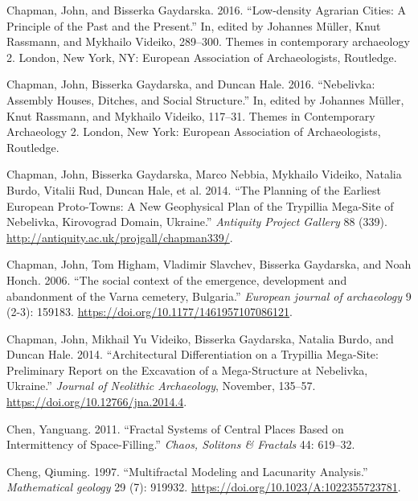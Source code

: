 \documentclass[
  12pt,
  a4paper, twoside]{book}
\newlength{\cslhangindent}
\newlength{\cslentryspacingunit} %
\newenvironment{CSLReferences}[2] %
 {%
  \setlength{\parindent}{0pt}
  \ifodd #1
  \let\oldpar\par
  \def\par{\hangindent=\cslhangindent\oldpar}
  \fi
  \setlength{\parskip}{#2\cslentryspacingunit}
 }%
 {}
\begin{document}
\begin{CSLReferences}{1}{0}
\leavevmode{}%
Chapman, John, and Bisserka Gaydarska. 2016. {``Low-density Agrarian Cities: A Principle of the Past and the Present.''} In, edited by Johannes Müller, Knut Rassmann, and Mykhailo Videiko, 289--300. Themes in contemporary archaeology 2. London, New York, NY: European Association of Archaeologists, Routledge.

\leavevmode{}%
Chapman, John, Bisserka Gaydarska, and Duncan Hale. 2016. {``Nebelivka: Assembly Houses, Ditches, and Social Structure.''} In, edited by Johannes Müller, Knut Rassmann, and Mykhailo Videiko, 117--31. Themes in Contemporary Archaeology 2. London, New York: European Association of Archaeologists, Routledge.

\leavevmode{}%
Chapman, John, Bisserka Gaydarska, Marco Nebbia, Mykhailo Videiko, Natalia Burdo, Vitalii Rud, Duncan Hale, et al. 2014. {``The Planning of the Earliest European Proto-Towns: A New Geophysical Plan of the Trypillia Mega-Site of Nebelivka, Kirovograd Domain, Ukraine.''} \emph{Antiquity Project Gallery} 88 (339). \url{http://antiquity.ac.uk/projgall/chapman339/}.

\leavevmode{}%
Chapman, John, Tom Higham, Vladimir Slavchev, Bisserka Gaydarska, and Noah Honch. 2006. {``The social context of the emergence, development and abandonment of the Varna cemetery, Bulgaria.''} \emph{European journal of archaeology} 9 (2-3): 159183. \url{https://doi.org/10.1177/1461957107086121}.

\leavevmode{}%
Chapman, John, Mikhail Yu Videiko, Bisserka Gaydarska, Natalia Burdo, and Duncan Hale. 2014. {``Architectural Differentiation on a Trypillia Mega-Site: Preliminary Report on the Excavation of a Mega-Structure at Nebelivka, Ukraine.''} \emph{Journal of Neolithic Archaeology}, November, 135--57. \url{https://doi.org/10.12766/jna.2014.4}.

\leavevmode{}%
Chen, Yanguang. 2011. {``Fractal Systems of Central Places Based on Intermittency of Space-Filling.''} \emph{Chaos, Solitons \& Fractals} 44: 619--32.

\leavevmode{}%
Cheng, Qiuming. 1997. {``Multifractal Modeling and Lacunarity Analysis.''} \emph{Mathematical geology} 29 (7): 919932. \url{https://doi.org/10.1023/A:1022355723781}.


\end{CSLReferences}
\end{document}
